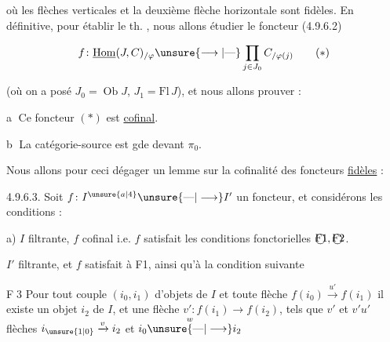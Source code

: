 
où les flèches verticales et la deuxième flèche horizontale sont fidèles.   En définitive, pour établir le th. , nous allons étudier le foncteur  (4.9.6.2)

\[
f\colon\underline{\operatorname{Hom}}(J,C)_{/\varphi}\unsure{\longrightarrow|\text{---}}\prod_{j\in J_0}C_{/\varphi(j)}\tag*{($\ast$)}
\]

(où on a posé $J_0=\operatorname{Ob}J$, $J_1=\mathrm{Fl}\,J$), et  nous allons prouver :

\textcircled{a} Ce foncteur  $(\ast)$ est \uline{cofinal}.

\textcircled{b} La catégorie-source  est gde devant $\pi_0$.

Nous allons pour ceci dégager un lemme  sur la cofinalité des foncteurs \uline{fidèles} :


\uline{} 4.9.6.3. Soit $f\colon I^{\unsure{a|4}}\unsure{\text{---}|\longrightarrow}I'$ un foncteur, et considérons les conditions :

a) $I$ filtrante, $f$ cofinal i.e.  $f$ satisfait les conditions fonctorielles $\text{\textcircled{F1}},\text{\textcircled{F2}}$.


 $I'$ filtrante, et $f$ satisfait à F1, ainsi qu'à la condition suivante

\textcircled{F3} Pour tout couple $(i_0,i_1)$ d'objets de $I$ et toute flèche  $f(i_0)\xrightarrow{u'}f(i_1)$ il existe un objet $i_2$ de $I$, et une flèche $v'\colon f(i_1)\longrightarrow f(i_2)$, tels que  $v'$ et $v'u'$     flèches  $i_{\unsure{1|0}}\xrightarrow{v}i_2$ et $i_0\overset{w}{\unsure{\text{---}|\longrightarrow}}i_2$ \unsure{;|:}

